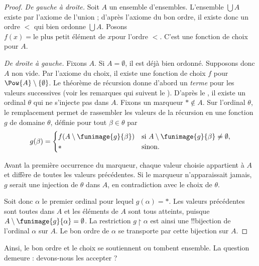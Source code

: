 \documentclass[../../../include/open-logic-section]{subfiles}
\begin{document}
\begin{proof}
\emph{De gauche à droite.}
Soit $A$ un ensemble d'ensembles.
L'ensemble $\bigcup A$ existe par l'axiome
de l'union ; d'après l'axiome du bon ordre,
il existe donc un ordre $<$ qui
bien ordonne $\bigcup A$. Posons
$f(x) = \text{le plus petit élément de $x$
pour l'ordre $<$}$.
C'est une fonction de choix pour $A$.

\emph{De droite à gauche.}
Fixons $A$. Si $A=\emptyset$, il est déjà
bien ordonné. Supposons donc $A$ non vide.
Par l'axiome du choix, il existe une fonction
de choix $f$ pour
$\Pow{A} \setminus \{\emptyset\}$.
Le théorème de récursion donne d'abord un \emph{terme} pour les
valeurs successives (voir les remarques qui suivent
le ).
D'après le , il existe un ordinal
$\theta$ qui ne s'injecte pas dans $A$. Fixons un marqueur
$\ast\notin A$. Sur l'ordinal $\theta$, le remplacement permet de
rassembler les valeurs de la récursion en une fonction $g$ de
domaine $\theta$, définie pour tout $\beta\in\theta$ par
\[
g(\beta) =
  \begin{cases}
    f(A\setminus\funimage{g}{\beta})
      & \text{si } A\setminus\funimage{g}{\beta}\neq\emptyset,\\
    \ast & \text{sinon}.
  \end{cases}
\]

Avant la première occurrence du marqueur, chaque valeur choisie
appartient à $A$ et diffère de toutes les valeurs précédentes.
Si le marqueur n'apparaissait jamais, $g$ serait une injection de
$\theta$ dans $A$, en contradiction avec le choix de $\theta$.

Soit donc $\alpha$ le premier ordinal pour lequel $g(\alpha)=\ast$.
Les valeurs précédentes sont toutes dans $A$ et les éléments de $A$
sont tous atteints, puisque $A\setminus\funimage{g}{\alpha}=\emptyset$.
La restriction $g\!\upharpoonright\!\alpha$ est ainsi une
!!{bijection} de l'ordinal $\alpha$ sur $A$. Le bon ordre de
$\alpha$ se transporte par cette bijection sur $A$.
\end{proof}

Ainsi, le bon ordre et le choix
se soutiennent ou tombent ensemble.
La question demeure : devons-nous
les accepter ?
\end{document}
